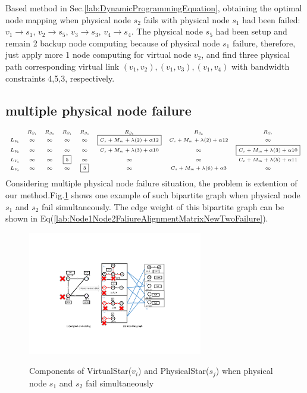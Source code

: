 Based method in Sec.\ref{lab:DynamicProgrammingEquation}, obtaining the optimal node mapping when physical node $s_2$ fails with physical node $s_1$ had been failed: $v_1 \rightarrow s_1$, $v_2 \rightarrow s_5$, $v_3 \rightarrow s_3$, $v_4 \rightarrow s_4$. The physical node $s_5$ had been setup and remain 2 backup node computing because of physical node $s_1$ failure, therefore, just apply more 1 node computing for virtual node $v_2$, and find three physical path corresponding virtual link $(v_1,v_2),(v_1,v_3),(v_1,v_4)$ with bandwidth constraints 4,5,3, respectively.



\subsection{multiple physical node failure}
\label{sec:multiplePhysicalNodeFailure}
\begin{equation*}
\tiny{
 {\begin{array}{*{20}{c}}
&R_{S_1}&R_{S_2}&R_{S_3}&R_{S_4}&R_{S_5}&R_{S_6}&R_{S_{7}}\\
{L_{V_1}}&\infty&\infty&\infty&\infty&\fbox{$C_{s}+M_{m}+\lambda(2)+\alpha 12$}&C_{s}+M_{m}+\lambda(2)+\alpha 12&\infty\\
L_{V_2}&\infty&\infty&\infty&\infty&C_{s}+M_{m}+\lambda(3)+\alpha 10&\infty&\fbox{$C_{s}+M_{m}+\lambda(3)+\alpha 10$}\\
L_{V_3}&\infty&\infty&\fbox{5}&\infty&\infty&\infty&C_{s}+M_{m}+\lambda(5)+\alpha 11\\
L_{V_4}&\infty&\infty&\infty&\fbox{3}&\infty&C_{s}+M_{m}+\lambda(6)+\alpha 3&\infty\\
\end{array}}
}
\label{lab:Node1Node2FaliureAlignmentMatrixNewTwoFailure}
\end{equation*}
Considering multiple physical node failure situation, the problem is extention of our method.Fig.\ref{fig:StarRepresentationTwoFailure} shows one example of such  bipartite graph when physical node $s_1$ and $s_2$ fail simultaneously. The edge weight of this   bipartite graph can be shown in  Eq(\ref{lab:Node1Node2FaliureAlignmentMatrixNewTwoFailure}).
\begin{figure}
\centering
\includegraphics[width=3in]{Fig/StarRepresentationTwoFailure}\\
  \caption{Components of VirtualStar($v_i$) and PhysicalStar($s_j$) when physical node $s_1$ and $s_2$ fail simultaneously}\label{fig:StarRepresentationTwoFailure}
\end{figure}

